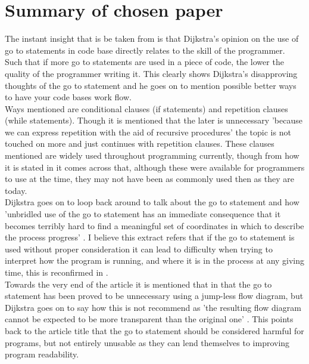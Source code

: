 \documentclass{scrartcl}
\begin{document}
\section{Summary of chosen paper}
The instant insight that is be taken from \cite{dijkstra2002go} is that Dijkstra's opinion on the use of go to statements in code base directly relates to the skill of the programmer. Such that if more go to statements are used in a piece of code, the lower the quality of the programmer writing it. This clearly shows Dijkstra's disapproving thoughts of the go to statement and he goes on to mention possible better ways to have your code bases work flow.\\ Ways mentioned are conditional clauses (if statements) and repetition clauses (while statements). Though it is mentioned that the later is unnecessary 'because we can express repetition with the aid of recursive procedures' \cite[p.147]{dijkstra2002go} the topic is not touched on more and just continues with repetition clauses. These clauses mentioned are widely used throughout programming currently, though from how it is stated in \cite{dijkstra2002go} it comes across that, although these were available for programmers to use at the time, they may not have been as commonly used then as they are today.\\ Dijkstra goes on to loop back around to talk about the go to statement and how 'unbridled use of the go to statement has an immediate consequence that it becomes terribly hard to find a meaningful set of coordinates in which to describe the process progress' \cite[p.147]{dijkstra2002go}. I believe this extract refers that if the go to statement is used without proper consideration it can lead to difficulty when trying to interpret how the program is running, and where it is in the process at any giving time, this is reconfirmed in \cite[p.37]{chun2005software}.\\ Towards the very end of the article it is mentioned that in \cite{bohm1966flow} that the go to statement has been proved to be unnecessary using a jump-less flow diagram, but Dijkstra goes on to say how this is not recommend as 'the resulting flow diagram cannot be expected to be more transparent than the original one' \cite[p.148]{dijkstra2002go}. This points back to the article title that the go to statement should be considered harmful for programs, but not entirely unusable as they can lend themselves to improving program readability.
\end{document}
